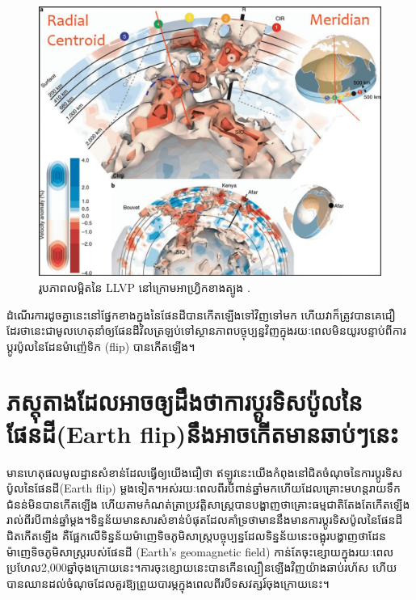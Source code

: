 \documentclass[10pt,twocolumn,letterpaper]{article}
\begin{document}
\begin{figure}[t]
\begin{center}
   \includegraphics[width=1\linewidth]{llvp.jpg}
\end{center}
   \caption{រូបភាពលម្អិតនៃ LLVP នៅក្រោមអាហ្វ្រិកខាងត្បូង \cite{28}.}
\label{fig:12}
\label{fig:onecol}
\end{figure}

ដំណើរការដូចគ្នានេះនៅផ្នែកខាងក្នុងនៃផែនដីបានកើតឡើងទៅវិញទៅមក ហើយវាក៏ត្រូវបានគេជឿដែរថានេះជាមូលហេតុនាំឲ្យផែនដីវិលត្រឡប់ទៅស្ថានភាពបច្ចុប្បន្នវិញក្នុងរយៈពេលមិនយូរបន្ទាប់ពីការប្តូរប៉ូលនៃដែនម៉ាញ៉េទិក (flip) បានកើតឡើង។

\section{ភស្ដុតាងដែលអាចឲ្យដឹងថាការប្ដូរទិសប៉ូលនៃផែនដី(Earth flip)នឹងអាចកើតមានឆាប់ៗនេះ}

មានហេតុផលមូលដ្ឋានសំខាន់ដែលធ្វើឲ្យយើងជឿថា ឥឡូវនេះយើងកំពុងនៅជិតចំណុចនៃការប្ដូរទិសប៉ូលនៃផែនដី(Earth flip) ម្តងទៀត។​អស់រយៈពេលពីរបីពាន់ឆ្នាំមកហើយដែលគ្រោះមហន្តរាយទឹកជំនន់មិនបានកើតឡើង ហើយតាមកំណត់ត្រាប្រវត្តិសាស្ត្របានបង្ហាញថាគ្រោះធម្មជាតិតែងតែកើតឡើងរាល់ពីរបីពាន់ឆ្នាំម្តង។ទិន្នន័យមានសារសំខាន់បំផុតដែលគាំទ្រថាមាននឹងមានការប្ដូរទិសប៉ូលនៃផែនដីជិតកើតឡើង គឺផ្អែកលើទិន្នន័យម៉ាញេទិចភូមិសាស្ត្របច្ចុប្បន្ន​ដែលទិន្នន័យនេះចង្អុរបង្ហាញថា​ដែនម៉ាញេទិចភូមិសាស្ត្ររបស់ផែនដី (Earth’s geomagnetic field) កាន់តែចុះខ្សោយក្នុងរយៈពេលប្រហែល2,000ឆ្នាំចុងក្រោយនេះ។ការចុះខ្សោយនេះបានកើនល្បឿនឡើងវិញយ៉ាងឆាប់រហ័ស ហើយបានឈានដល់ចំណុចដែលគួរឱ្យព្រួយបារម្ភក្នុងពេលពីរបីទសវត្សរ៍ចុងក្រោយនេះ។
\end{document}
